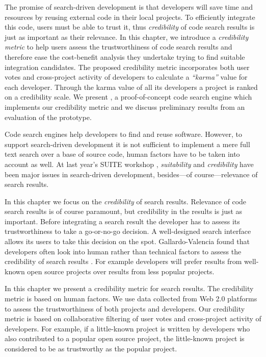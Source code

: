 \documentclass[10pt]{book}
\begin{document}
\asteriskasteriskasterisk

The promise of search-driven development is that developers will save time and resources by reusing external code in their local projects. To efficiently integrate this code, users must be able to trust it, thus \emph{credibility} of code search results is just as important as their relevance. 
%
In this chapter, we introduce a \emph{credibility metric} to help users assess the trustworthiness of code search results and therefore ease the cost-benefit analysis they undertake trying to find suitable integration candidates. The proposed credibility metric incorporates both user votes and cross-project activity of developers to calculate a \emph{``karma''} value for each developer. Through the karma value of all its developers a project is ranked on a credibility scale.
%
We present \Jbd, a proof-of-concept code search engine which implements our credibility metric and we discuss preliminary results from an evaluation of the prototype.

Code search engines help developers to find and reuse software. However, to support search-driven development it is not sufficient to implement a mere full text search over a base of source code, human factors have to be taken into account as well. At last year's SUITE workshop \cite{Kuhn09a}, \emph{suitability} and \emph{credibility} have been major issues in search-driven development, besides---of course---relevance of search results.  

In this chapter we focus on the \emph{credibility} of search results. Relevance of code search results is of course paramount, but credibility in the results is just as important. Before integrating a search result the developer has to assess its trustworthiness to take a go-or-no-go decision. A well-designed search interface allows its users to take this decision on the spot. Gallardo-Valencia \etal found that developers often look into human rather than technical factors to assess the credibility of search results \cite{Gall09a}. For example developers will prefer results from well-known open source projects over results from less popular projects.

In this chapter we present a credibility metric for search results. The credibility metric is based on human factors. We use data collected from Web 2.0 platforms to assess the trustworthiness of both projects and developers. Our credibility metric is based on collaborative filtering of user votes and cross-project activity of developers. For example, if a little-known project is written by developers who also contributed to a popular open source project, the little-known project is considered to be as trustworthy as the popular project. 
\end{document}
